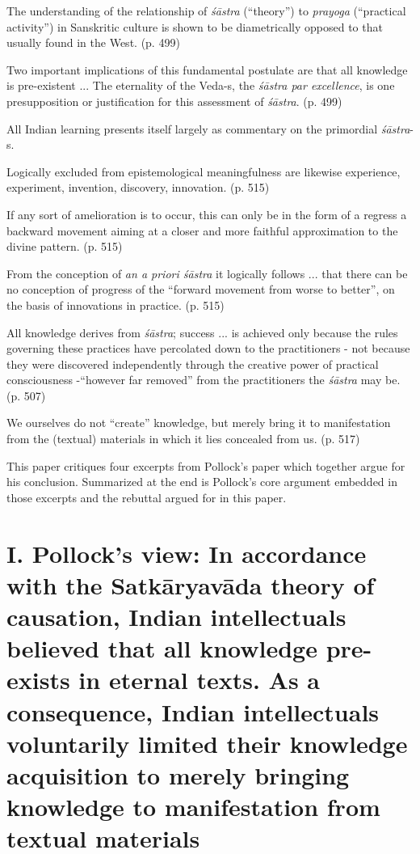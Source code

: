 \begin{myquote}
The understanding of the relationship of \textit{śāstra} (``theory'') to \textit{prayoga} (``practical activity'') in Sanskritic culture is shown to be diametrically opposed to that usually found in the West. (p. 499)

Two important implications of this fundamental postulate are that all knowledge is pre-existent ... The eternality of the Veda-s, the \textit{śāstra par excellence}, is one presupposition or justification for this assessment of \textit{śāstra}. (p. 499)

All Indian learning presents itself largely as commentary on the primordial \textit{śāstra}-s.

Logically excluded from epistemological meaningfulness are likewise experience, experiment, invention, discovery, innovation. (p. 515)

If any sort of amelioration is to occur, this can only be in the form of a regress a backward movement aiming at a closer and more faithful approximation to the divine pattern. (p. 515)

From the conception of \textit{an a priori śāstra} it logically follows ... that there can be no conception of progress of the ``forward movement from worse to better'', on the basis of innovations in practice. (p. 515)

All knowledge derives from \textit{śāstra}; success ... is achieved only because the rules governing these practices have percolated down to the practitioners - not because they were discovered independently through the creative power of practical consciousness -``however far removed'' from the practitioners the \textit{śāstra} may be. (p. 507)

We ourselves do not ``create'' knowledge, but merely bring it to manifestation from the (textual) materials in which it lies concealed from us. (p. 517) 
\end{myquote}

This paper critiques four excerpts from Pollock's paper which together argue for his conclusion. Summarized at the end is Pollock's core argument embedded in those excerpts and the rebuttal argued for in this paper.

\section*{I. Pollock's view:  In accordance with the Satkāryavāda theory of causation, Indian intellectuals believed that all knowledge pre-exists in eternal texts. As a consequence, Indian intellectuals voluntarily limited their knowledge acquisition to merely bringing knowledge to manifestation from textual materials}

